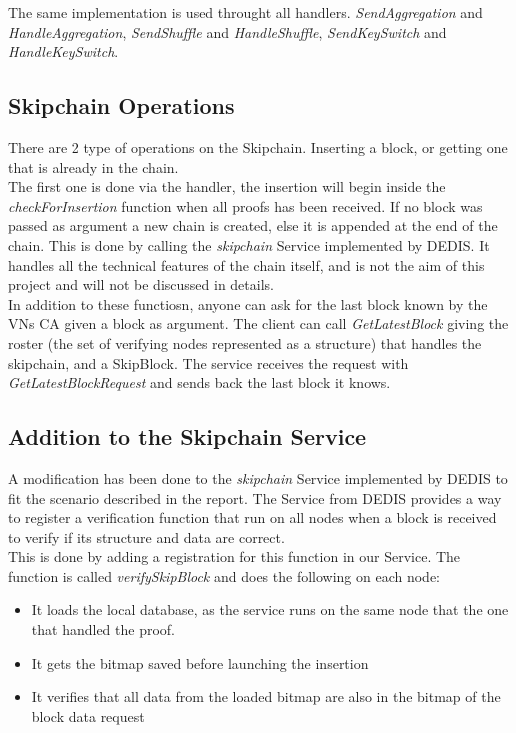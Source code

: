 \documentclass{article}
\begin{document}
The same implementation is used throught all handlers. \textit{SendAggregation} and \textit{HandleAggregation}, \textit{SendShuffle} and \textit{HandleShuffle}, \textit{SendKeySwitch} and \textit{HandleKeySwitch}.

\subsection{Skipchain Operations}
There are 2 type of operations on the Skipchain. Inserting a block, or getting one that is already in the chain.\\
The first one is done via the handler, the insertion will begin inside the \textit{checkForInsertion} function when all proofs has been received. If no block was passed as argument a new chain is created, else it is appended at the end of the chain. This is done by calling the \textit{skipchain} Service implemented by DEDIS. It handles all the technical features of the chain itself, and is not the aim of this project and will not be discussed in details.\\
In addition to these functiosn, anyone can ask for the last block known by the VNs CA given a block as argument. The client can call \textit{GetLatestBlock} giving the roster (the set of verifying nodes represented as a structure) that handles the skipchain, and a SkipBlock. The service receives the request with \textit{GetLatestBlockRequest} and sends back the last block it knows.

\subsection{Addition to the Skipchain Service}
A modification has been done to the \textit{skipchain} Service implemented by DEDIS to fit the scenario described in the report. The Service from DEDIS provides a way to register a  verification function that run on all nodes when a block is received to verify if its structure and data are correct.\\
This is done by adding a registration for this function in our Service. The function is called \textit{verifySkipBlock} and does the following on each node:
\begin{itemize}
\item{It loads the local database, as the service runs on the same node that the one that handled the proof.}
\item{It gets the bitmap saved before launching the insertion}
\item{It verifies that all data from the loaded bitmap are also in the bitmap of the block data request}
\end{itemize}
\end{document}
